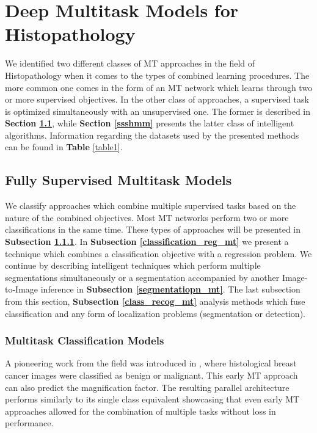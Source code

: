 \documentclass[conference]{IEEEtran}
\begin{document}
\section{Deep Multitask Models for Histopathology}
\label{chapter:InvestigatedApproach}

We identified two different classes of MT approaches in the field of Histopathology when it comes to the types of combined learning procedures. The more common one comes in the form of an MT network which learns through two or more supervised objectives. In the other class of approaches, a supervised task is optimized simultaneously with an unsupervised one. The former is described in \textbf{Section \ref{hsmm}}, while \textbf{Section \ref{ssshmm}} presents the latter class of intelligent algorithms. Information regarding the datasets used by the presented methods can be found in \textbf{Table} \ref{table1}.

\subsection{Fully Supervised
Multitask Models}
\label{hsmm}

We classify approaches which combine multiple supervised tasks based on the nature of the combined objectives. Most MT networks perform two or more classifications in the same time. These types of approaches will be presented in \textbf{Subsection \ref{classification_mt}}. In \textbf{Subsection \ref{classification_reg_mt}} we present a technique which combines a classification objective with a regression problem. We continue by describing intelligent techniques which perform multiple segmentations simultaneously or a segmentation accompanied by another Image-to-Image inference in \textbf{Subsection \ref{segmentatiopn_mt}}. The last subsection from this section, \textbf{Subsection \ref{class_recog_mt}} analysis methods which fuse classification and any form of localization problems (segmentation or detection). 

\subsubsection{Multitask Classification Models}
\label{classification_mt}
A pioneering work from the field was introduced in \cite{bayramoglu2016deep}, where histological breast cancer images were classified as benign or malignant. This early MT approach can also predict the magnification factor. The resulting parallel architecture performs similarly to its single class equivalent showcasing that even early MT approaches allowed for the combination of multiple tasks without loss in performance. 
\end{document}
